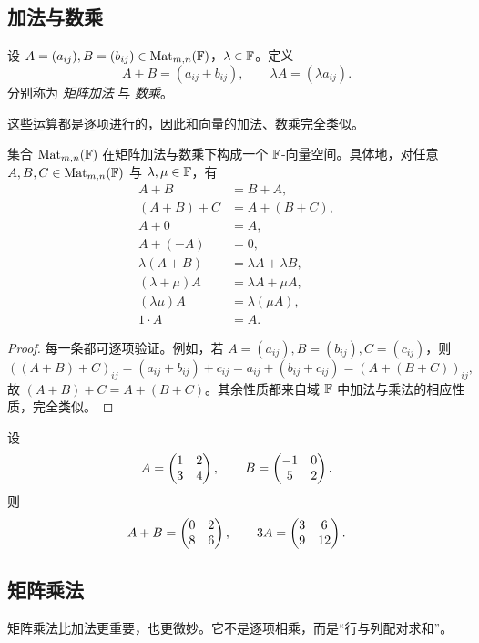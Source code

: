 \subsection{加法与数乘}

\begin{definition}
设 $A=(a_{ij}),B=(b_{ij})\in\mathrm{Mat}_{m,n}(\mathbb{F})$，$\lambda\in\mathbb{F}$。定义
\[
A+B=(a_{ij}+b_{ij}),\qquad \lambda A=(\lambda a_{ij}).
\]
分别称为 \emph{矩阵加法} 与 \emph{数乘}。
\end{definition}

这些运算都是逐项进行的，因此和向量的加法、数乘完全类似。

\begin{proposition}
集合 $\mathrm{Mat}_{m,n}(\mathbb{F})$ 在矩阵加法与数乘下构成一个 $\mathbb{F}$-向量空间。具体地，对任意 $A,B,C\in\mathrm{Mat}_{m,n}(\mathbb{F})$ 与 $\lambda,\mu\in\mathbb{F}$，有
\begin{align*}
A+B&=B+A,\\
(A+B)+C&=A+(B+C),\\
A+0&=A,\\
A+(-A)&=0,\\
\lambda(A+B)&=\lambda A+\lambda B,\\
(\lambda+\mu)A&=\lambda A+\mu A,\\
(\lambda\mu)A&=\lambda(\mu A),\\
1\cdot A&=A.
\end{align*}
\end{proposition}

\begin{proof}
每一条都可逐项验证。例如，若 $A=(a_{ij}),B=(b_{ij}),C=(c_{ij})$，则
\[
((A+B)+C)_{ij}=(a_{ij}+b_{ij})+c_{ij}=a_{ij}+(b_{ij}+c_{ij})=(A+(B+C))_{ij},
\]
故 $(A+B)+C=A+(B+C)$。其余性质都来自域 $\mathbb{F}$ 中加法与乘法的相应性质，完全类似。
\end{proof}

\begin{example}
设
\[
A=\begin{pmatrix} 1&2\\3&4 \end{pmatrix},\qquad B=\begin{pmatrix} -1&0\\5&2 \end{pmatrix}.
\]
则
\[
A+B=\begin{pmatrix} 0&2\\8&6 \end{pmatrix},
\qquad 3A=\begin{pmatrix} 3&6\\9&12 \end{pmatrix}.
\]
\end{example}

\subsection{矩阵乘法}

矩阵乘法比加法更重要，也更微妙。它不是逐项相乘，而是“行与列配对求和”。

